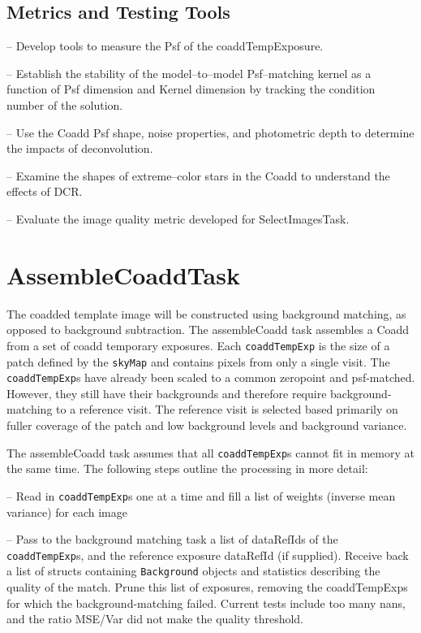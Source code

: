 \documentclass[prd, nofootinbib, floatfix, 11pt,tightenlines,times]{article}
\begin{document}
\subsection{Metrics and Testing Tools}

-- Develop tools to measure the Psf of the coaddTempExposure.

-- Establish the stability of the model--to--model Psf--matching
kernel as a function of Psf dimension and Kernel dimension by tracking
the condition number of the solution.

-- Use the Coadd Psf shape, noise properties, and photometric depth 
to determine the impacts of deconvolution.

-- Examine the shapes of extreme--color stars in the Coadd to understand the effects of DCR.

-- Evaluate the image quality metric developed for SelectImagesTask.


\section{AssembleCoaddTask} 

The coadded template image will be constructed using background
matching, as opposed to background subtraction. The assembleCoadd task assembles a Coadd from a set of coadd temporary exposures.   Each {\tt coaddTempExp} is the size of a patch defined by the {\tt skyMap} and contains pixels from only a single visit.  The {\tt coaddTempExp}s have already been scaled to a common zeropoint and psf-matched.  However, they still have their backgrounds and therefore require background-matching to a reference visit. The reference visit is selected based primarily on fuller coverage of the patch and low background levels and background variance. 

The assembleCoadd task assumes that all {\tt coaddTempExp}s cannot fit in memory at the same time. The following steps outline the processing in more detail:

-- Read in {\tt coaddTempExp}s one at a time and fill a list of weights (inverse mean variance) for each image 

-- Pass to the background matching task a list of dataRefIds of the {\tt coaddTempExp}s, and the reference exposure dataRefId (if supplied).  Receive back a list of structs containing {\tt Background} objects and statistics describing the quality of the match.  Prune this list of exposures, removing the coaddTempExps for which the background-matching failed.  Current tests include too many nans, and the ratio MSE/Var did not make the quality threshold.
\end{document}

